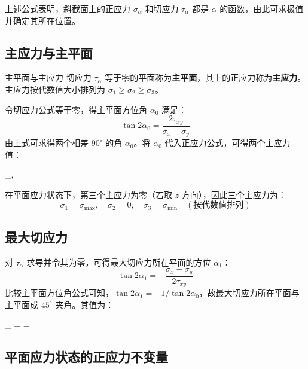 上述公式表明，斜截面上的正应力 $\sigma_\alpha$ 和切应力 $\tau_\alpha$ 都是 $\alpha$ 的函数，由此可求极值并确定其所在位置。

\subsection{主应力与主平面}

\begin{mydefinition}{主平面与主应力}
    切应力 $\tau_\alpha$ 等于零的平面称为\textbf{主平面}，其上的正应力称为\textbf{主应力}。主应力按代数值大小排列为 $\sigma_1 \ge \sigma_2 \ge \sigma_3$。
\end{mydefinition}

令切应力公式等于零，得主平面方位角 $\alpha_0$ 满足：
\begin{equation}
    \tan 2\alpha_0 = \frac{2\tau_{xy}}{\sigma_x - \sigma_y}
\end{equation}
由上式可求得两个相差 $90^\circ$ 的角 $\alpha_0$。将 $\alpha_0$ 代入正应力公式，可得两个主应力值：
\begin{myformula}
    \sigma_{\max,\min} =  \pm {}
\end{myformula}
在平面应力状态下，第三个主应力为零（若取 $z$ 方向），因此三个主应力为：
\[
\sigma_1 = \sigma_{\max},\quad \sigma_2 = 0,\quad \sigma_3 = \sigma_{\min} \quad (\text{按代数值排列})
\]

\subsection{最大切应力}

对 $\tau_\alpha$ 求导并令其为零，可得最大切应力所在平面的方位 $\alpha_1$：
\begin{equation}
    \tan 2\alpha_1 = -\frac{\sigma_x - \sigma_y}{2\tau_{xy}}
\end{equation}
比较主平面方位角公式可知，$\tan 2\alpha_1 = -1 / \tan 2\alpha_0$，故最大切应力所在平面与主平面成 $45^\circ$ 夹角。其值为：
\begin{myformula}
    \tau_{\max} =  = 
\end{myformula}

\subsection{平面应力状态的正应力不变量}

